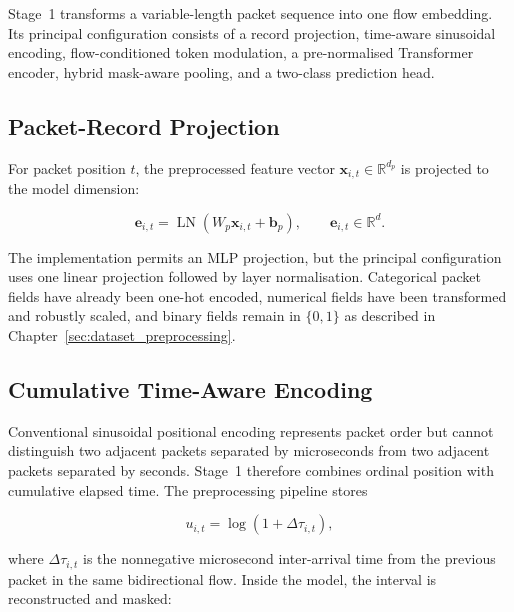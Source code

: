 \documentclass[11pt,fleqn]{report}
\begin{document}
Stage~1 transforms a variable-length packet sequence into one flow embedding. Its principal configuration consists of a record projection, time-aware sinusoidal encoding, flow-conditioned token modulation, a pre-normalised Transformer encoder, hybrid mask-aware pooling, and a two-class prediction head.

\subsection{Packet-Record Projection}
\label{subsubsec:packet_projection}

For packet position $t$, the preprocessed feature vector $\mathbf{x}_{i,t}\in\mathbb{R}^{d_p}$ is projected to the model dimension:

\begin{equation}
    \mathbf{e}_{i,t}
    =\operatorname{LN}
    \left(W_p\mathbf{x}_{i,t}+\mathbf{b}_p\right),
    \qquad
    \mathbf{e}_{i,t}\in\mathbb{R}^{d}.
    \label{eq:record_projection}
\end{equation}

The implementation permits an MLP projection, but the principal configuration uses one linear projection followed by layer normalisation. Categorical packet fields have already been one-hot encoded, numerical fields have been transformed and robustly scaled, and binary fields remain in $\{0,1\}$ as described in Chapter~\ref{sec:dataset_preprocessing}.

\subsection{Cumulative Time-Aware Encoding}
\label{subsubsec:time_aware_encoding}

Conventional sinusoidal positional encoding represents packet order but cannot distinguish two adjacent packets separated by microseconds from two adjacent packets separated by seconds. Stage~1 therefore combines ordinal position with cumulative elapsed time. The preprocessing pipeline stores

\begin{equation}
    u_{i,t}=\log\left(1+\Delta\tau_{i,t}\right),
    \label{eq:stored_log_iat}
\end{equation}

where $\Delta\tau_{i,t}$ is the nonnegative microsecond inter-arrival time from the previous packet in the same bidirectional flow. Inside the model, the interval is reconstructed and masked:
\end{document}
